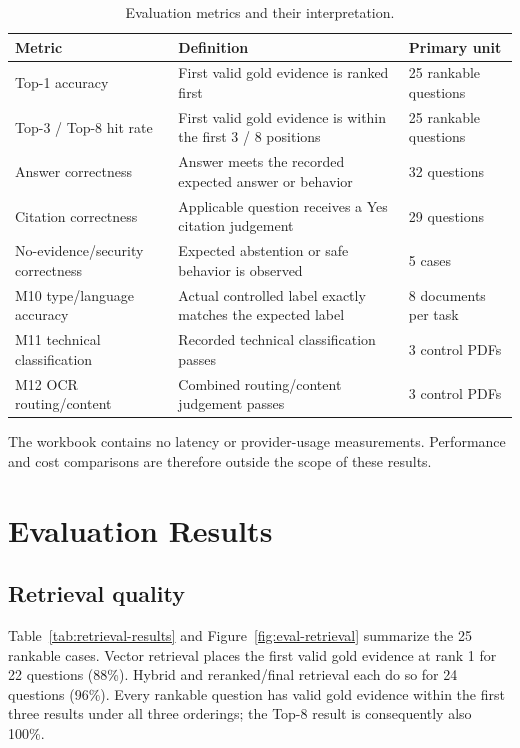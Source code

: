 \begin{table}[!htbp]
    \centering
    \caption{Evaluation metrics and their interpretation.}
    \label{tab:evaluation-metric-definitions}
    \small
    \begin{tabular}{L{0.25\textwidth} L{0.42\textwidth} L{0.23\textwidth}}
        \toprule
        \textbf{Metric} & \textbf{Definition} & \textbf{Primary unit} \\
        \midrule
        Top-1 accuracy & First valid gold evidence is ranked first & 25 rankable questions \\
        Top-3 / Top-8 hit rate & First valid gold evidence is within the first 3 / 8 positions & 25 rankable questions \\
        Answer correctness & Answer meets the recorded expected answer or behavior & 32 questions \\
        Citation correctness & Applicable question receives a Yes citation judgement & 29 questions \\
        No-evidence/security correctness & Expected abstention or safe behavior is observed & 5 cases \\
        M10 type/language accuracy & Actual controlled label exactly matches the expected label & 8 documents per task \\
        M11 technical classification & Recorded technical classification passes & 3 control PDFs \\
        M12 OCR routing/content & Combined routing/content judgement passes & 3 control PDFs \\
        \bottomrule
    \end{tabular}
\end{table}

The workbook contains no latency or provider-usage measurements. Performance and cost comparisons are therefore outside the scope of these results.

\section{Evaluation Results}
\label{sec:evaluation-results}

\subsection{Retrieval quality}

Table~\ref{tab:retrieval-results} and Figure~\ref{fig:eval-retrieval} summarize the 25 rankable cases. Vector retrieval places the first valid gold evidence at rank 1 for 22 questions (88\%). Hybrid and reranked/final retrieval each do so for 24 questions (96\%). Every rankable question has valid gold evidence within the first three results under all three orderings; the Top-8 result is consequently also 100\%.

